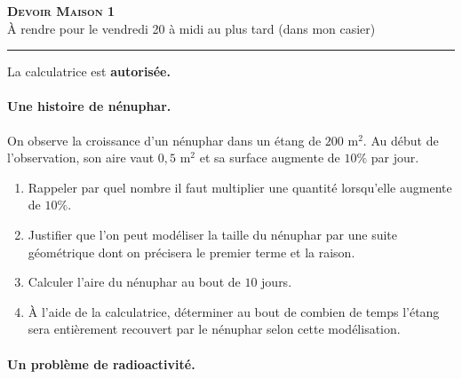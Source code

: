 \documentclass[11pt]{article}
\begin{document}

\begin{center}
\textbf{\LARGE \textsc{Devoir Maison 1}}\\[2mm]

{\large À rendre pour le vendredi 20 à midi au plus tard (dans mon casier)}\\[1mm]
\noindent\rule{10cm}{0.4pt}
\end{center}
La calculatrice est \textbf{autorisée.}

\paragraph{Une histoire de nénuphar.} On observe la croissance d'un nénuphar
dans un étang de $200$ m$^2$. Au début de l'observation, son aire vaut $0,5$
m$^2$ et sa surface augmente de $10\%$ par jour.
\begin{enumerate}
  \item Rappeler par quel nombre il faut multiplier une quantité lorsqu'elle
    augmente de $10\%$.
  \item Justifier que l'on peut modéliser la taille du nénuphar par une suite
    géométrique dont on précisera le premier terme et la raison.
  \item Calculer l'aire du nénuphar au bout de $10$ jours.
  \item À l'aide de la calculatrice, déterminer au bout de combien de temps
    l'étang sera entièrement recouvert par le nénuphar selon cette modélisation.
\end{enumerate}

\paragraph{Un problème de radioactivité.}
\end{document}
